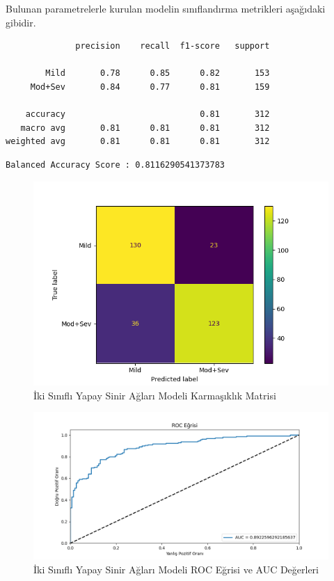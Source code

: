 \documentclass[12pt,twoside]{deuthesis}
\begin{document}
Bulunan parametrelerle kurulan modelin sınıflandırma metrikleri aşağıdaki gibidir.
\begin{verbatim}
              precision    recall  f1-score   support

        Mild       0.78      0.85      0.82       153
     Mod+Sev       0.84      0.77      0.81       159

    accuracy                           0.81       312
   macro avg       0.81      0.81      0.81       312
weighted avg       0.81      0.81      0.81       312
\end{verbatim}
\begin{verbatim}
Balanced Accuracy Score : 0.8116290541373783
\end{verbatim}
\begin{figure}

{\centering \includegraphics[width=1.05\linewidth,height=0.6\textheight]{figure/nn_bin_conf} 

}

\caption{İki Sınıflı Yapay Sinir Ağları Modeli Karmaşıklık Matrisi}\label{fig:unnamed-chunk-83}
\end{figure}
\begin{figure}

{\centering \includegraphics[width=1.05\linewidth,height=0.6\textheight]{figure/MLPClassifier_binary_roc} 

}

\caption{İki Sınıflı Yapay Sinir Ağları Modeli ROC Eğrisi ve AUC Değerleri}\label{fig:unnamed-chunk-84}
\end{figure}
\end{document}
